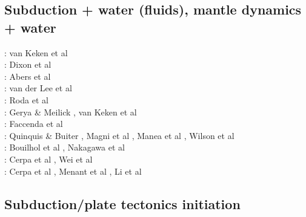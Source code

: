 \subsection{Subduction + water (fluids), mantle dynamics + water}

\begin{scriptsize}
\twothousandtwo: van Keken et al \cite{vakp02}\\
\twothousandfour: Dixon et al \cite{didb04}\\
\twothousandsix: Abers et al \cite{abvk06}\\
\twothousandeight: van der Lee et al \cite{vary08}\\
\twothousandten: Roda et al \cite{roms10}\\
\twothousandeleven: Gerya \& Meilick \cite{geme11}, van Keken et al \cite{vahs11}\\
\twothousandtwelve: Faccenda et al \cite{fagm12}\\
\twothousandfourteen: Quinquis \& Buiter \cite{qubu14}, Magni et al \cite{mabv14}, 
                      Manea et al \cite{malg14}, Wilson et al \cite{wisv14}\\
\twothousandfifteen: Bouilhol et al \cite{bomv15}, Nakagawa et al \cite{nani15}\\
\twothousandseventeen: Cerpa et al \cite{ceww17}, Wei et al \cite{wewv17}\\
\twothousandnineteen: Cerpa et al \cite{ceww19}, Menant et al \cite{meag19}, Li et al \cite{ligc19}
\end{scriptsize}

\subsection{Subduction/plate tectonics initiation}

